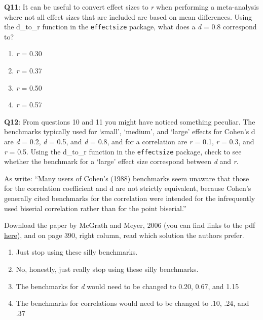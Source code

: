 \documentclass[
  oneside]{book}
\providecommand{\tightlist}{%
  \setlength{\itemsep}{0pt}\setlength{\parskip}{0pt}}
\begin{document}
\textbf{Q11}: It can be useful to convert effect sizes to \emph{r} when performing a meta-analysis where not all effect sizes that are included are based on mean differences. Using the d\_to\_r function in the \texttt{effectsize} package, what does a \emph{d} = 0.8 correspond to?

\begin{enumerate}
\def\labelenumi{\Alph{enumi})}
\tightlist
\item
  \emph{r} = 0.30
\item
  \emph{r} = 0.37
\item
  \emph{r} = 0.50
\item
  \emph{r} = 0.57
\end{enumerate}

\textbf{Q12}: From questions 10 and 11 you might have noticed something peculiar. The benchmarks typically used for `small', `medium', and `large' effects for Cohen's d are \emph{d} = 0.2, \emph{d} = 0.5, and \emph{d} = 0.8, and for a correlation are \emph{r} = 0.1, \emph{r} = 0.3, and \emph{r} = 0.5. Using the d\_to\_r function in the \texttt{effectsize} package, check to see whether the benchmark for a `large' effect size correspond between \emph{d} and \emph{r}.

As \citet{mcgrath_when_2006} write: ``Many users of Cohen's (1988) benchmarks seem unaware that those for the correlation coefficient and d are not strictly equivalent, because Cohen's generally cited benchmarks for the correlation were intended for the infrequently used biserial correlation rather than for the point biserial.''

Download the paper by McGrath and Meyer, 2006 (you can find links to the pdf \href{https://scholar.google.com/scholar?cluster=18022919125620514097\&as_sdt=0\%2C5\&inst=1903264034810781805}{here}), and on page 390, right column, read which solution the authors prefer.

\begin{enumerate}
\def\labelenumi{\Alph{enumi})}
\tightlist
\item
  Just stop using these silly benchmarks.
\item
  No, honestly, just really stop using these silly benchmarks.
\item
  The benchmarks for \emph{d} would need to be changed to 0.20, 0.67, and 1.15
\item
  The benchmarks for correlations would need to be changed to .10, .24, and .37
\end{enumerate}
\end{document}
